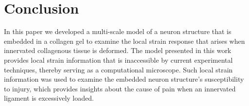 \documentclass[]{interact}
\begin{document}
%
\section{Conclusion}
\label{sec:conclusion}
In this paper we developed a multi-scale model of a neuron structure that is embedded in a collagen gel to examine the local strain response that arises when innervated collagenous tissue is deformed. The model presented in this work provides local strain information that is inaccessible by current experimental techniques, thereby serving as a computational microscope. Such local strain information was used to examine the embedded neuron structure's susceptibility to injury, which provides insights about the cause of pain when an innervated ligament is excessively loaded.
\end{document}
